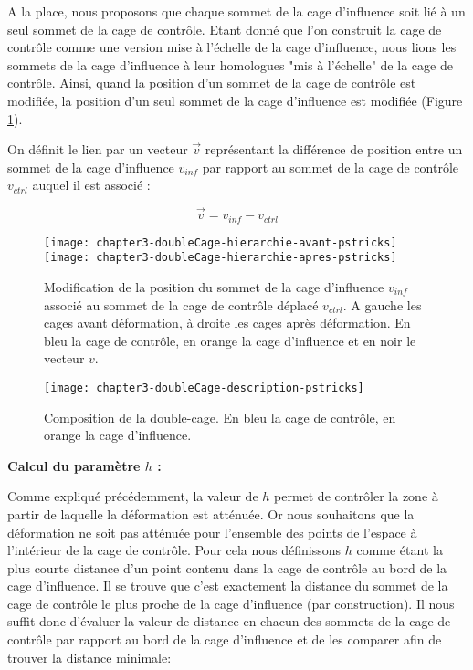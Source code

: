 A la place, nous proposons que chaque sommet de la cage d'influence soit lié à
un seul sommet de la cage de contrôle. Etant donné que l'on construit la cage
de contrôle comme une version mise à l'échelle de la cage d'influence, nous
lions les sommets de la cage d'influence à leur homologues "mis à l'échelle"
de la cage de contrôle. Ainsi, quand la position d'un sommet de la cage de
contrôle est modifiée, la position d'un seul sommet de la cage d'influence est
modifiée (Figure \ref{MELHie}).

On définit le lien par un vecteur $\overrightarrow{v}$ représentant la
différence de position entre un sommet de la cage d'influence $v_{inf}$ par
rapport au sommet de la cage de contrôle $v_{ctrl}$ auquel il est associé :

\begin{displaymath}
  \overrightarrow{v} = v_{inf}-v_{ctrl}
\end{displaymath}

\begin{figure}[!ht]
  \texttt{[image: chapter3-doubleCage-hierarchie-avant-pstricks]}
  \texttt{[image: chapter3-doubleCage-hierarchie-apres-pstricks]}

  \caption[Association des cages de contrôle et d'influence] {Modification de
la position du sommet de la cage d'influence $v_{inf}$ associé au sommet de la
cage de contrôle déplacé $v_{ctrl}$. A gauche les cages avant déformation, à
droite les cages après déformation. En bleu la cage de contrôle, en orange la
cage d'influence et en noir le vecteur $v$.}

  \label{MELHie}
\end{figure}

\begin{figure}[!ht]
    \texttt{[image: chapter3-doubleCage-description-pstricks]}

    \caption[Composition de la double-cage] {Composition de la double-cage. En
    bleu la cage de contrôle, en orange la cage d'influence.}

    \label{MELDou}
\end{figure}

\textbf{Calcul du paramètre $h$ :}

Comme expliqué précédemment, la valeur de $h$ permet de contrôler la zone à
partir de laquelle la déformation est atténuée. Or nous souhaitons que la
déformation ne soit pas atténuée pour l'ensemble des points de l'espace à
l'intérieur de la cage de contrôle. Pour cela nous définissons $h$ comme étant
la plus courte distance d'un point contenu dans la cage de contrôle au bord de
la cage d'influence. Il se trouve que c'est exactement la distance du sommet
de la cage de contrôle le plus proche de la cage d'influence (par
construction). Il nous suffit donc d'évaluer la valeur de distance en chacun
des sommets de la cage de contrôle par rapport au bord de la cage d'influence
et de les comparer afin de trouver la distance minimale:

